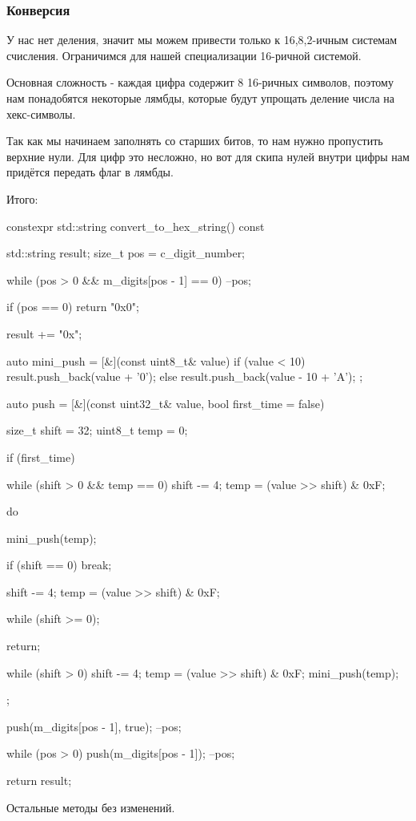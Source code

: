 \subsubsection{Конверсия}
У нас нет деления, значит мы можем привести только к 16,8,2-ичным системам счисления. Ограничимся для нашей специализации 16-ричной системой.

Основная сложность - каждая цифра содержит 8 16-ричных символов, поэтому нам понадобятся некоторые лямбды, которые будут упрощать деление числа на хекс-символы.

Так как мы начинаем заполнять со старших битов, то нам нужно пропустить верхние нули. Для цифр это несложно, но вот для скипа нулей внутри цифры нам придётся передать флаг в лямбды.

Итого:
\begin{cppcode}
constexpr std::string convert_to_hex_string() const {
    std::string result;
    size_t pos = c_digit_number;

    while (pos > 0 && m_digits[pos - 1] == 0) {
        --pos;
    }

    if (pos == 0) {
        return "0x0";
    }

    result += "0x";

    auto mini_push = [&](const uint8_t& value) {
        if (value < 10) {
            result.push_back(value + '0');
        } else {
            result.push_back(value - 10 + 'A');
        }
    };

    auto push = [&](const uint32_t& value, bool first_time = false) {
        size_t shift = 32;
        uint8_t temp = 0;

        if (first_time) {
            while (shift > 0 && temp == 0) {
                shift -= 4;
                temp = (value >> shift) & 0xF;
            }

            do {
                mini_push(temp);

                if (shift == 0) {
                    break;
                }

                shift -= 4;
                temp = (value >> shift) & 0xF;
            } while (shift >= 0);

            return;
        }

        while (shift > 0) {
            shift -= 4;
            temp = (value >> shift) & 0xF;
            mini_push(temp);
        }
    };

    push(m_digits[pos - 1], true);
    --pos;

    while (pos > 0) {
        push(m_digits[pos - 1]);
        --pos;
    }

    return result;
}
\end{cppcode}
Остальные методы без изменений.
